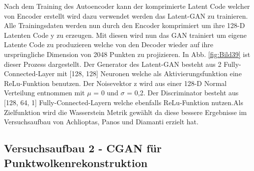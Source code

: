 \documentclass{llncs}
\begin{document}
Nach dem Training des Autoencoder kann der komprimierte Latent Code welcher von Encoder erstellt wird dazu verwendet werden das Latent-GAN zu trainieren. Alle Trainingsdaten werden nun durch den Encoder komprimiert um ihre 128-D Latenten Code y zu erzeugen. Mit diesen wird nun das GAN trainiert um eigene Latente Code zu produzieren welche von den Decoder wieder auf ihre ursprüngliche Dimension von 2048 Punkten zu projizieren. In Abb. \ref{fig:Bild39} ist dieser Prozess dargestellt. Der Generator des Latent-GAN besteht aus 2 Fully-Connected-Layer mit [128, 128] Neuronen welche als Aktivierungsfunktion eine ReLu-Funktion benutzen. Der Noisevektor z wird aus einer 128-D Normal Verteilung entnommen mit $\mu$ = 0 und $\sigma$ =  0,2. Der Discriminator besteht aus [128, 64, 1] Fully-Connected-Layern welche ebenfalls ReLu-Funktion nutzen.Als Zielfunktion wird die Wasserstein Metrik gewählt da diese bessere Ergebnisse im Versuchsaufbau von Achlioptas, Panos und Diamanti\cite{3dgan} erzielt hat. 

\subsection{Versuchsaufbau 2 - CGAN für Punktwolkenrekonstruktion }\label{sec:versuch2-aufbau}
\end{document}
